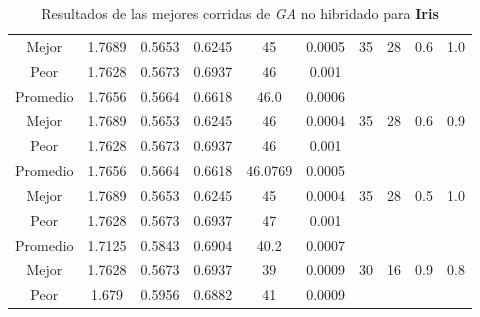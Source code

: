 \begin{table}[h!]
\begin{center}
\begin{tabular}{|c|c|c|c|c|c|c|c|c|c|}
            \cline{1-6}
            Mejor & 1.7689 & 0.5653  & 0.6245 & 45 & 0.0005 & 35 & 28 & 0.6 & 1.0\\
            \cline{1-6}
            Peor & 1.7628 & 0.5673  & 0.6937 & 46 & 0.001 &  &  &  & \\
        \hline
        \hline
            Promedio  & 1.7656 & 0.5664 & 0.6618 & 46.0 & 0.0006 &  &  &  & \\
            \cline{1-6}
            Mejor & 1.7689 & 0.5653  & 0.6245 & 46 & 0.0004 & 35 & 28 & 0.6 & 0.9\\
            \cline{1-6}
            Peor & 1.7628 & 0.5673  & 0.6937 & 46 & 0.001 &  &  &  & \\
        \hline
        \hline
            Promedio  & 1.7656 & 0.5664 & 0.6618 & 46.0769 & 0.0005 &  &  &  & \\
            \cline{1-6}
            Mejor & 1.7689 & 0.5653  & 0.6245 & 45 & 0.0004 & 35 & 28 & 0.5 & 1.0\\
            \cline{1-6}
            Peor & 1.7628 & 0.5673  & 0.6937 & 47 & 0.001 &  &  &  & \\
        \hline
        \hline
            Promedio  & 1.7125 & 0.5843 & 0.6904 & 40.2 & 0.0007 &  &  &  & \\
            \cline{1-6}
            Mejor & 1.7628 & 0.5673  & 0.6937 & 39 & 0.0009 & 30 & 16 & 0.9 & 0.8\\
            \cline{1-6}
            Peor & 1.679 & 0.5956  & 0.6882 & 41 & 0.0009 &  &  &  & \\
        \hline
        \end{tabular}
        \caption{Resultados de las mejores corridas de \emph{GA} no hibridado para {\bf Iris}}
        \label{tb:tablegaalgcsv}
    \end{center}
\end{table}


